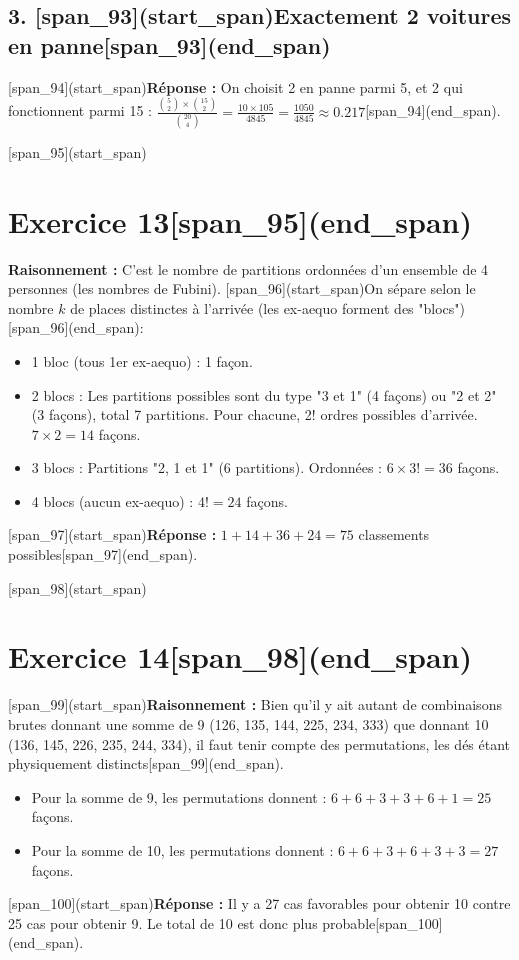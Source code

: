 \documentclass[11pt,a4paper]{article}
\begin{document}
\subsection*{3. [span_93](start_span)Exactement 2 voitures en panne[span_93](end_span)}
[span_94](start_span)\textbf{Réponse :} On choisit 2 en panne parmi 5, et 2 qui fonctionnent parmi 15 : $\frac{\binom{5}{2} \times \binom{15}{2}}{\binom{20}{4}} = \frac{10 \times 105}{4845} = \frac{1050}{4845} \approx 0.217$[span_94](end_span).

\hrulefill

[span_95](start_span)\section*{Exercice 13[span_95](end_span)}
\textbf{Raisonnement :} C'est le nombre de partitions ordonnées d'un ensemble de 4 personnes (les nombres de Fubini). [span_96](start_span)On sépare selon le nombre $k$ de places distinctes à l'arrivée (les ex-aequo forment des "blocs")[span_96](end_span):
\begin{itemize}
    \item 1 bloc (tous 1er ex-aequo) : 1 façon.
    \item 2 blocs : Les partitions possibles sont du type "3 et 1" (4 façons) ou "2 et 2" (3 façons), total 7 partitions. Pour chacune, 2! ordres possibles d'arrivée. $7 \times 2 = 14$ façons.
    \item 3 blocs : Partitions "2, 1 et 1" (6 partitions). Ordonnées : $6 \times 3! = 36$ façons.
    \item 4 blocs (aucun ex-aequo) : $4! = 24$ façons.
\end{itemize}
[span_97](start_span)\textbf{Réponse :} $1 + 14 + 36 + 24 = 75$ classements possibles[span_97](end_span).

\hrulefill

[span_98](start_span)\section*{Exercice 14[span_98](end_span)}
[span_99](start_span)\textbf{Raisonnement :} Bien qu'il y ait autant de combinaisons brutes donnant une somme de 9 (126, 135, 144, 225, 234, 333) que donnant 10 (136, 145, 226, 235, 244, 334), il faut tenir compte des permutations, les dés étant physiquement distincts[span_99](end_span). 
\begin{itemize}
    \item Pour la somme de 9, les permutations donnent : $6 + 6 + 3 + 3 + 6 + 1 = 25$ façons.
    \item Pour la somme de 10, les permutations donnent : $6 + 6 + 3 + 6 + 3 + 3 = 27$ façons.
\end{itemize}
[span_100](start_span)\textbf{Réponse :} Il y a 27 cas favorables pour obtenir 10 contre 25 cas pour obtenir 9. Le total de 10 est donc plus probable[span_100](end_span).
\end{document}
